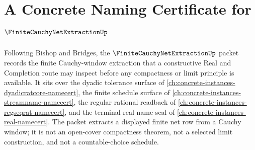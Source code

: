 \chapter{A Concrete Naming Certificate for $\FiniteCauchyNetExtractionUp$}
\label{ch:concrete-instances-finite-cauchy-net-extraction-namecert}

Following Bishop and Bridges, the $\FiniteCauchyNetExtractionUp$ packet records the finite Cauchy-window extraction that a constructive Real and Completion route may inspect before any compactness or limit principle is available. It sits over the dyadic tolerance surface of \autoref{ch:concrete-instances-dyadicratcore-namecert}, the finite schedule surface of \autoref{ch:concrete-instances-streamname-namecert}, the regular rational readback of \autoref{ch:concrete-instances-regseqrat-namecert}, and the terminal real-name seal of \autoref{ch:concrete-instances-real-namecert}. The packet extracts a displayed finite net row from a Cauchy window; it is not an open-cover compactness theorem, not a selected limit construction, and not a countable-choice schedule.

